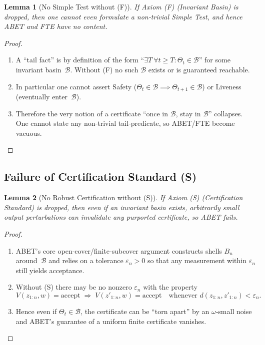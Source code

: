 \documentclass[12pt]{article}
\theoremstyle{definition}
\theoremstyle{plain}
\newtheorem{lemma}{Lemma}[section]
\begin{document}
\begin{lemma}[No Simple Test without (F)]\label{lem:no-F}
If Axiom (F) (Invariant Basin) is dropped, then one cannot even formulate a non‐trivial Simple Test, and hence ABET and FTE have no content.
\end{lemma}
\begin{proof}
\begin{enumerate}[label=(\arabic*)]
  \item  A ``tail fact'' is by definition of the form ``$\exists T\ \forall t\ge T:\Theta_t\in\mathcal B$'' for some invariant basin~$\mathcal B$.  Without (F) no such $\mathcal B$ exists or is guaranteed reachable.
  \item  In particular one cannot assert Safety ($\Theta_t\in\mathcal B\implies\Theta_{t+1}\in\mathcal B$) or Liveness (eventually enter~$\mathcal B$).
  \item  Therefore the very notion of a certificate ``once in $\mathcal B$, stay in $\mathcal B$'' collapses.  One cannot state any non‐trivial tail‐predicate, so ABET/FTE become vacuous.
\end{enumerate}
\end{proof}

\subsection{Failure of Certification Standard (S)}

\begin{lemma}[No Robust Certification without (S)]\label{lem:no-S}
If Axiom (S) (Certification Standard) is dropped, then even if an invariant basin exists, arbitrarily small output perturbations can invalidate any purported certificate, so ABET fails.
\end{lemma}
\begin{proof}
\begin{enumerate}[label=(\arabic*)]
  \item  ABET’s core open‐cover/finite‐subcover argument constructs shells $B_n$ around~$\mathcal B$ and relies on a tolerance $\varepsilon_n>0$ so that any measurement within $\varepsilon_n$ still yields acceptance.
  \item  Without (S) there may be no nonzero $\varepsilon_n$ with the property
  \[
    V(z_{1:n},w)=\text{accept}
    \;\Longrightarrow\;
    V(z'_{1:n},w)=\text{accept}
    \quad\text{whenever }d(z_{1:n},z'_{1:n})<\varepsilon_n.
  \]
  \item  Hence even if $\Theta_t\in\mathcal B$, the certificate can be ``torn apart'' by an $\omega$‐small noise and ABET’s guarantee of a uniform finite certificate vanishes.
\end{enumerate}
\end{proof}
\end{document}
